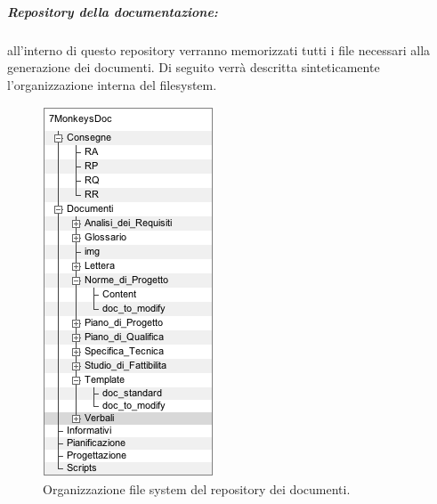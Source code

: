\subparagraph{Repository della documentazione:}
\label{rdocumentazione}
all'interno di questo repository\g{} verranno memorizzati tutti i file necessari alla generazione dei documenti. Di seguito verrà descritta sinteticamente l'organizzazione interna del filesystem.

\begin{figure}[h!]
\centering
\includegraphics[scale=0.5]{./content/Immagini/Filesystem}
\caption{Organizzazione file system del repository dei documenti.}
\label{filesystem}
\end{figure}

